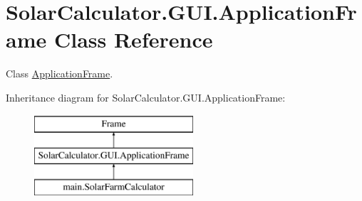 \hypertarget{class_solar_calculator_1_1_g_u_i_1_1_application_frame}{\section{Solar\-Calculator.\-G\-U\-I.\-Application\-Frame Class Reference}
\label{class_solar_calculator_1_1_g_u_i_1_1_application_frame}
}


Class \hyperlink{class_solar_calculator_1_1_g_u_i_1_1_application_frame}{Application\-Frame}.  


Inheritance diagram for Solar\-Calculator.\-G\-U\-I.\-Application\-Frame\-:\begin{figure}[H]
\begin{center}
\leavevmode
\includegraphics[height=3.000000cm]{class_solar_calculator_1_1_g_u_i_1_1_application_frame}
\end{center}
\end{figure}
